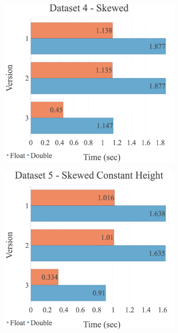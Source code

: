 \begin{figure}[H]
\begin{adjustwidth}{-2cm}{-2cm}
\begin{subfigure}{.62\textwidth}
  \centering
  \includegraphics[width=1\textwidth]{img/experiments/multi-versions-4_SKEWED.png}
\end{subfigure}
\begin{subfigure}{.62\textwidth}
  \centering
  \includegraphics[width=1\textwidth]{img/experiments/multi-versions-5_SKEWEDCONSTHEIGHT.png}

\end{subfigure}
\end{adjustwidth}
\end{figure}

